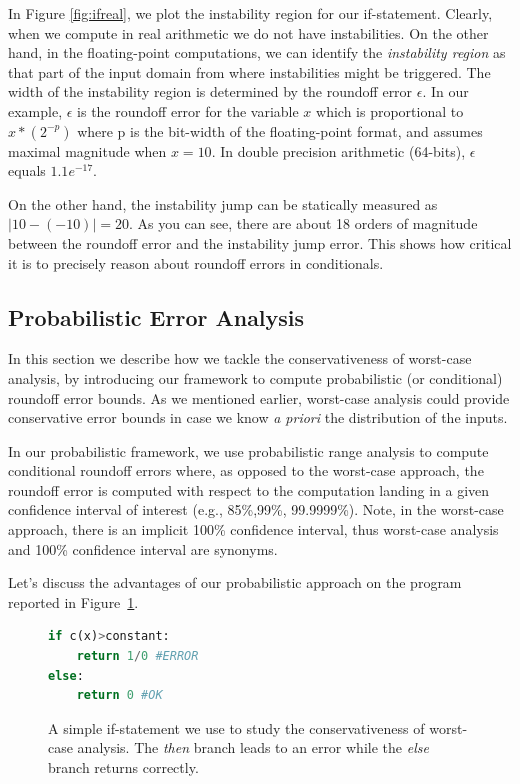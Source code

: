 In Figure \ref{fig:ifreal}, we plot the instability region for our if-statement. Clearly, when we compute in real arithmetic we do not have instabilities. On the other hand, in the floating-point computations, we can identify the \emph{instability region} as that part of the input domain from where instabilities might be triggered.
%
The width of the instability region is determined by the roundoff error $\epsilon$.
%
In our example, $\epsilon$ is the roundoff error for the variable $x$ which is proportional to $x*(2^{-p})$ where p is the bit-width of the floating-point format, and assumes maximal magnitude when $x=10$.  
%
In double precision arithmetic (64-bits), $\epsilon$ equals $1.1e^{-17}$.
%

On the other hand, the instability jump can be statically measured as $|10-(-10)|=20$. As you can see, there are about 18 orders of magnitude between the roundoff error and the instability jump error.
%
This shows how critical it is to precisely reason about roundoff errors in conditionals.
 
\subsection{Probabilistic Error Analysis}
\label{sec:prob}
%
In this section we describe how we tackle the conservativeness of worst-case analysis, by introducing our framework to compute probabilistic (or conditional) roundoff error bounds.
%
As we mentioned earlier, worst-case analysis could provide conservative error bounds in case we know \emph{a priori} the distribution of the inputs. 
%
%

In our probabilistic framework, we use probabilistic range analysis to compute conditional roundoff errors where, as opposed to the worst-case approach, the roundoff error is computed with respect to the computation landing in a given confidence interval of interest (e.g., 85\%,99\%, 99.9999\%).
%
Note, in the worst-case approach, there is an implicit 100\% confidence interval, thus worst-case analysis and 100\% confidence interval are synonyms.
%

%
Let's discuss the advantages of our probabilistic approach on the program reported in Figure~\ref{fig:prob}.
%
\begin{figure}[h!]
	\begin{lstlisting}[frame=single, language=Python]
if c(x)>constant:
	return 1/0 #ERROR
else:
	return 0 #OK
	\end{lstlisting}
	\caption{A simple if-statement we use to study the conservativeness of worst-case analysis. The \emph{then} branch leads to an error while the \emph{else} branch returns correctly.}
	\label{fig:prob}
\end{figure}
%

